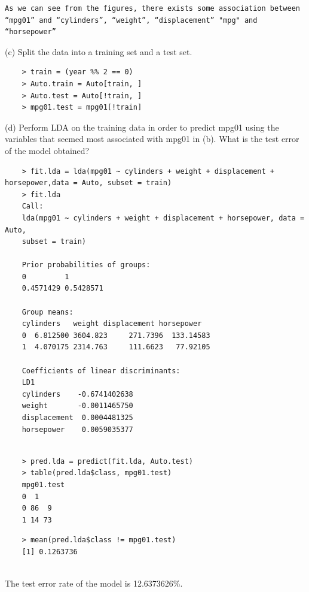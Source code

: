 \documentclass{article}
\begin{document}
\begin{verbatim}	
As we can see from the figures, there exists some association between “mpg01” and “cylinders”, “weight”, “displacement” "mpg" and “horsepower”
\end{verbatim}

\newpage
(c) Split the data into a training set and a test set.
\begin{program}
	\begin{verbatim}	
	> train = (year %% 2 == 0)
	> Auto.train = Auto[train, ]
	> Auto.test = Auto[!train, ]
	> mpg01.test = mpg01[!train]
	\end{verbatim}
\end{program}


\newpage
(d) Perform LDA on the training data in order to predict mpg01 using the variables that seemed most associated with mpg01 in (b). What is the test error of the model obtained?

\begin{program}
	\begin{verbatim}	
	> fit.lda = lda(mpg01 ~ cylinders + weight + displacement + horsepower,data = Auto, subset = train)
	> fit.lda
	Call:
	lda(mpg01 ~ cylinders + weight + displacement + horsepower, data = Auto, 
	subset = train)
	
	Prior probabilities of groups:
	0         1 
	0.4571429 0.5428571 
	
	Group means:
	cylinders   weight displacement horsepower
	0  6.812500 3604.823     271.7396  133.14583
	1  4.070175 2314.763     111.6623   77.92105
	
	Coefficients of linear discriminants:
	LD1
	cylinders    -0.6741402638
	weight       -0.0011465750
	displacement  0.0004481325
	horsepower    0.0059035377
	
	\end{verbatim}
\end{program}

\begin{program}
	\begin{verbatim}	
	> pred.lda = predict(fit.lda, Auto.test)
	> table(pred.lda$class, mpg01.test)
	mpg01.test
	0  1
	0 86  9
	1 14 73	
	\end{verbatim}
\end{program}

\begin{program}
	\begin{verbatim}	
	> mean(pred.lda$class != mpg01.test)
	[1] 0.1263736
	
	\end{verbatim}
\end{program}
The test error rate of the model is 12.6373626\%.
\end{document}
